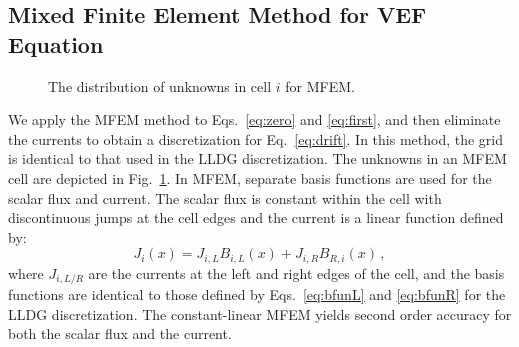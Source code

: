 
\subsection{Mixed Finite Element Method for VEF Equation}
\begin{figure}
	\centering
	 
	\caption{The distribution of unknowns in cell $i$ for MFEM. }
	\label{fig:mfem_grid}
\end{figure}
We apply the MFEM method to Eqs.~\ref{eq:zero} and \ref{eq:first}, and then eliminate the currents to obtain a discretization for Eq.~\ref{eq:drift}.  In this 
method, the grid is identical to that used in the LLDG \SN discretization. The unknowns in an MFEM cell are depicted in Fig.~\ref{fig:mfem_grid}. In MFEM, separate basis functions are used for the scalar flux and 
current. The scalar flux is constant within the cell with discontinuous jumps at the cell edges and the current is a linear function defined by: 
	\begin{equation} \label{eq:MFEM_current}
		J_i(x) = J_{i,L} B_{i,L}(x) + J_{i,R} B_{R,i}(x) \,, 
	\end{equation} 
where $J_{i,L/R}$ are the currents at the left and right edges of the cell, and the basis functions are identical to those 
defined by Eqs.~\ref{eq:bfunL} and \ref{eq:bfunR} for the LLDG \SN discretization. The constant-linear MFEM yields second 
order accuracy for both the scalar flux and the current.  

